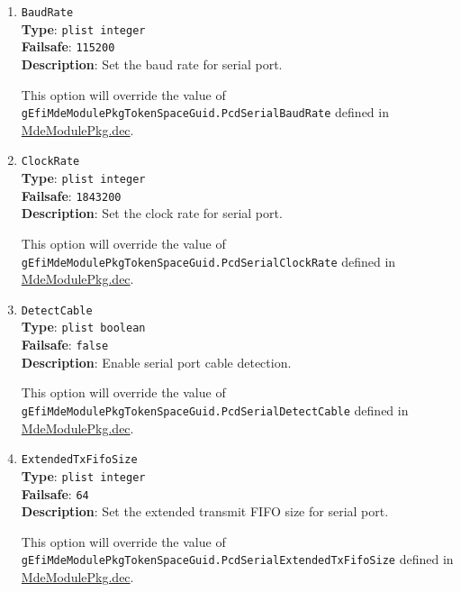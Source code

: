 \documentclass[]{article}
\begin{document}
\begin{enumerate}

\item
  \texttt{BaudRate}\\
  \textbf{Type}: \texttt{plist\ integer}\\
  \textbf{Failsafe}: \texttt{115200}\\
  \textbf{Description}: Set the baud rate for serial port.

  This option will override the value of \texttt{gEfiMdeModulePkgTokenSpaceGuid.PcdSerialBaudRate}
  defined in \href{https://github.com/acidanthera/audk/blob/master/MdeModulePkg/MdeModulePkg.dec}{MdeModulePkg.dec}.

\item
  \texttt{ClockRate}\\
  \textbf{Type}: \texttt{plist\ integer}\\
  \textbf{Failsafe}: \texttt{1843200}\\
  \textbf{Description}: Set the clock rate for serial port.

  This option will override the value of \texttt{gEfiMdeModulePkgTokenSpaceGuid.PcdSerialClockRate}
  defined in \href{https://github.com/acidanthera/audk/blob/master/MdeModulePkg/MdeModulePkg.dec}{MdeModulePkg.dec}.

\item
  \texttt{DetectCable}\\
  \textbf{Type}: \texttt{plist\ boolean}\\
  \textbf{Failsafe}: \texttt{false}\\
  \textbf{Description}: Enable serial port cable detection.

  This option will override the value of \texttt{gEfiMdeModulePkgTokenSpaceGuid.PcdSerialDetectCable}
  defined in \href{https://github.com/acidanthera/audk/blob/master/MdeModulePkg/MdeModulePkg.dec}{MdeModulePkg.dec}.

\item
  \texttt{ExtendedTxFifoSize}\\
  \textbf{Type}: \texttt{plist\ integer}\\
  \textbf{Failsafe}: \texttt{64}\\
  \textbf{Description}: Set the extended transmit FIFO size for serial port.

  This option will override the value of \texttt{gEfiMdeModulePkgTokenSpaceGuid.PcdSerialExtendedTxFifoSize}
  defined in \href{https://github.com/acidanthera/audk/blob/master/MdeModulePkg/MdeModulePkg.dec}{MdeModulePkg.dec}.


\end{enumerate}
\end{document}
